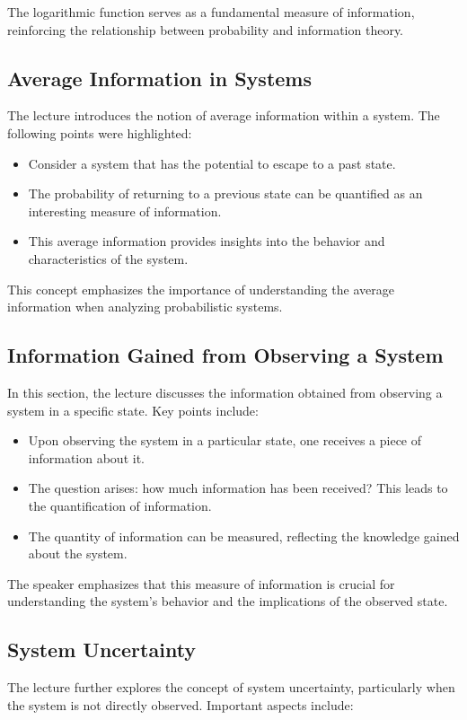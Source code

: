 \documentclass[a4paper]{article}
\begin{document}
The logarithmic function serves as a fundamental measure of information, reinforcing the relationship between probability and information theory.

\subsection{Average Information in Systems}
The lecture introduces the notion of average information within a system. The following points were highlighted:

\begin{itemize}
    \item Consider a system that has the potential to escape to a past state.
    \item The probability of returning to a previous state can be quantified as an interesting measure of information.
    \item This average information provides insights into the behavior and characteristics of the system.
\end{itemize}

This concept emphasizes the importance of understanding the average information when analyzing probabilistic systems.

\subsection{Information Gained from Observing a System}
In this section, the lecture discusses the information obtained from observing a system in a specific state. Key points include:

\begin{itemize}
    \item Upon observing the system in a particular state, one receives a piece of information about it.
    \item The question arises: how much information has been received? This leads to the quantification of information.
    \item The quantity of information can be measured, reflecting the knowledge gained about the system.
\end{itemize}

The speaker emphasizes that this measure of information is crucial for understanding the system's behavior and the implications of the observed state.

\subsection{System Uncertainty}
The lecture further explores the concept of system uncertainty, particularly when the system is not directly observed. Important aspects include:
\end{document}
